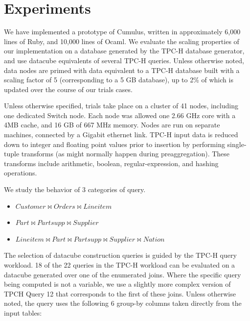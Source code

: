 
\section{Experiments}
\label{sec:experiments}

We have implemented a prototype of Cumulus, written in approximately 6,000 lines of Ruby, and 10,000 lines of Ocaml.  We evaluate the scaling properties of our implementation on a database generated by the TPC-H database generator, and use datacube equivalents of several TPC-H queries.  Unless otherwise noted, data nodes are primed with data equivalent to a TPC-H database built with a scaling factor of 5 (corresponding to a 5 GB database), up to 2\% of which is updated over the course of our trials cases.

Unless otherwise specified, trials take place on a cluster of 41 nodes, including one dedicated Switch node.  Each node was allowed one 2.66 GHz core with a 4MB cache, and 16 GB of 667 MHz memory.  Nodes are run on separate machines, connected by a Gigabit ethernet link.  TPC-H input data is reduced down to integer and floating point values prior to insertion by performing single-tuple transforms (as might normally happen during preaggregation).  These transforms include arithmetic, boolean, regular-expression, and hashing operations.

We study the behavior of 3 categories of query.
\begin{itemize}
\item $Customer \bowtie Orders \bowtie Lineitem$
\item $Part \bowtie Partsupp \bowtie Supplier$
\item $Lineitem \bowtie Part \bowtie Partsupp \bowtie Supplier \bowtie Nation$
\end{itemize}
The selection of datacube construction queries is guided by the TPC-H query workload.  18 of the 22 queries in the TPC-H workload can be evaluated on a datacube generated over one of the enumerated joins.  Where the specific query being computed is not a variable, we use a slightly more complex version of TPCH Query 12 that corresponds to the first of these joins.  Unless otherwise noted, the query uses the following 6 group-by columns taken directly from the input tables: 

